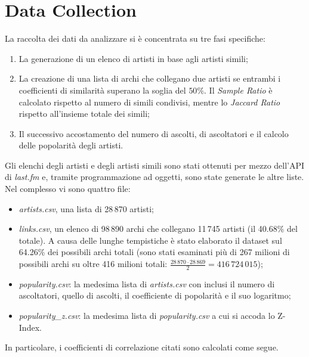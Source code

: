 \documentclass[sigchi]{acmart}
\begin{document}
\section{Data Collection}

La raccolta dei dati da analizzare si è concentrata su tre fasi specifiche:
\begin{enumerate}
\item La generazione di un elenco di artisti in base agli artisti simili;
\item La creazione di una lista di archi che collegano due artisti se entrambi i coefficienti di similarità superano la soglia del $50\%$. Il {\itshape Sample Ratio} è calcolato rispetto al numero di simili condivisi, mentre lo {\itshape Jaccard Ratio} rispetto all'insieme totale dei simili;
\item Il successivo accostamento del numero di ascolti, di ascoltatori e il calcolo delle popolarità degli artisti.
\end{enumerate}
Gli elenchi degli artisti e degli artisti simili sono stati ottenuti per mezzo dell'API di {\itshape last.fm} e, tramite programmazione ad oggetti, sono state generate le altre liste. Nel complesso vi sono quattro file:

\begin{itemize}
\item {\itshape artists.csv}, una lista di 28\,870 artisti;
\item {\itshape links.csv}, un elenco di 98\,890 archi che collegano 11\,745 artisti (il 40.68\% del totale). A causa delle lunghe tempistiche è stato elaborato il dataset sul 64.26\% dei possibili archi totali (sono stati esaminati più di 267 milioni di possibili archi su oltre 416 milioni totali: $\frac{28\,870 \cdot 28\,869}{2} = 416\,724\,015$);
\item {\itshape popularity.csv}: la medesima lista di {\itshape artists.csv} con inclusi il numero di ascoltatori, quello di ascolti, il coefficiente di popolarità e il suo logaritmo;
\item {\itshape popularity\_z.csv}: la medesima lista di {\itshape popularity.csv} a cui si accoda lo Z-Index.
\end{itemize}

In particolare, i coefficienti di correlazione citati sono calcolati come segue.

\renewcommand{\arraystretch}{1.8}  %
\end{document}
